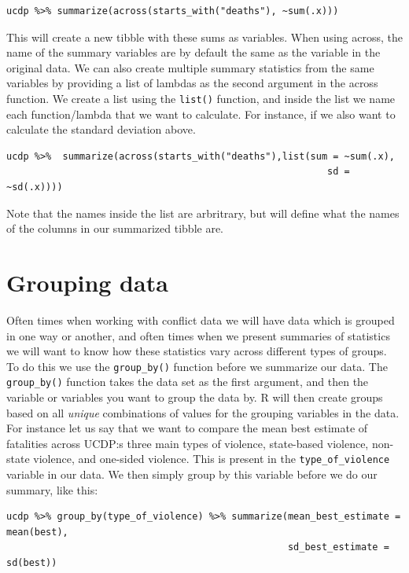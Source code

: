 \documentclass[
]{book}
\begin{document}
\begin{verbatim}
ucdp %>% summarize(across(starts_with("deaths"), ~sum(.x)))
\end{verbatim}

This will create a new tibble with these sums as variables. When using across, the name of the summary variables are by default the same as the variable in the original data. We can also create multiple summary statistics from the same variables by providing a list of lambdas as the second argument in the across function. We create a list using the \texttt{list()} function, and inside the list we name each function/lambda that we want to calculate. For instance, if we also want to calculate the standard deviation above.

\begin{verbatim}
ucdp %>%  summarize(across(starts_with("deaths"),list(sum = ~sum(.x),
                                                         sd = ~sd(.x))))
\end{verbatim}

Note that the names inside the list are arbritrary, but will define what the names of the columns in our summarized tibble are.

\hypertarget{grouping-data}{%
\section{Grouping data}\label{grouping-data}}

Often times when working with conflict data we will have data which is grouped in one way or another, and often times when we present summaries of statistics we will want to know how these statistics vary across different types of groups. To do this we use the \texttt{group\_by()} function before we summarize our data. The \texttt{group\_by()} function takes the data set as the first argument, and then the variable or variables you want to group the data by. R will then create groups based on all \emph{unique} combinations of values for the grouping variables in the data. For instance let us say that we want to compare the mean best estimate of fatalities across UCDP:s three main types of violence, state-based violence, non-state violence, and one-sided violence. This is present in the \texttt{type\_of\_violence} variable in our data. We then simply group by this variable before we do our summary, like this:

\begin{verbatim}
ucdp %>% group_by(type_of_violence) %>% summarize(mean_best_estimate = mean(best),
                                                  sd_best_estimate = sd(best))
\end{verbatim}
\end{document}

